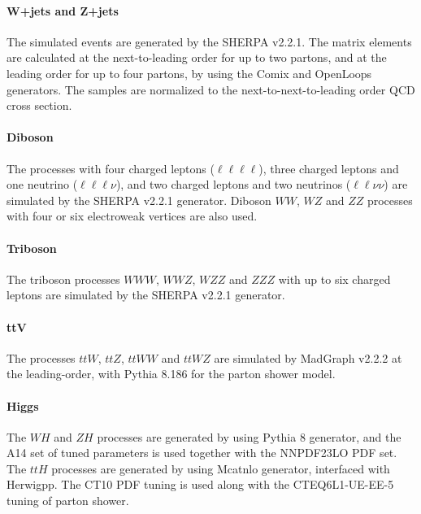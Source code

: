 \paragraph{\bf W+jets and Z+jets}
The simulated events are generated by the {\sc SHERPA} v2.2.1.
The matrix elements are calculated at the next-to-leading order for up to two partons, and at the leading order for up to four partons, by using the {\sc Comix} and {\sc OpenLoops} generators.
The samples are normalized to the next-to-next-to-leading order QCD cross section.

\paragraph{\bf Diboson}
The processes with four charged leptons ($\ell \ell \ell \ell$), three charged leptons and one neutrino ($\ell \ell \ell \nu$), and two charged leptons and two neutrinos ($\ell \ell \nu \nu$) are simulated by the {\sc SHERPA} v2.2.1 generator.
Diboson $WW$, $WZ$ and $ZZ$ processes with four or six electroweak vertices are also used.

\paragraph{\bf Triboson}
The triboson processes $WWW$, $WWZ$, $WZZ$ and $ZZZ$ with up to six charged leptons are simulated by the {\sc SHERPA} v2.2.1 generator.

\paragraph{\bf ttV}
The processes $ttW$, $ttZ$, $ttWW$ and $ttWZ$ are simulated by {\sc MadGraph} v2.2.2 at the leading-order, with {\sc Pythia} 8.186 for the parton shower model.

\paragraph{\bf Higgs}
The $WH$ and $ZH$ processes are generated by using {\sc Pythia} 8 generator, and the {\sc A14} set of tuned parameters is used together with the {\sc NNPDF23LO} PDF set.
The $ttH$ processes are generated by using {\sc Mcatnlo} generator, interfaced with {\sc Herwigpp}.
The CT10 PDF tuning is used along with the CTEQ6L1-UE-EE-5 tuning of parton shower.

